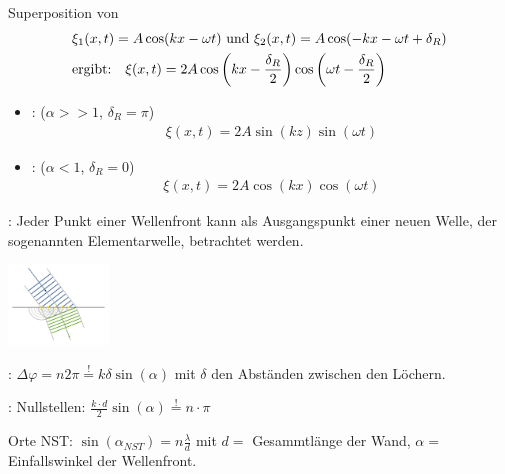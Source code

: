 \vspace{1\baselineskip}

Superposition von
\begin{align*}
    &\xi_1 (x,t) = A \cos(kx-\omega t) \text{ und } \xi_2 (x,t) = A \cos (-kx - \omega t + \delta_R)
    \\ &\text{ergibt:} \quad 
    \xi(x,t) = 2 A \cos \left( k x - \frac{\delta_R}{2} \right) \cos \left( \omega t - \frac{\delta_R}{2} \right)
\end{align*}
\begin{itemize}
    \item {}: ($\alpha >> 1$, $\delta_R = \pi$)
        \begin{align*}
            \xi(x,t) = 2A \sin(kz) \sin(\omega t)
        \end{align*}
    \item {}: ($\alpha < 1$, $\delta_R = 0$)
        \begin{align*}
            \xi(x,t) = 2 A \cos (kx) \cos (\omega t)
        \end{align*}
\end{itemize}

\vspace{1\baselineskip}

:
Jeder Punkt einer Wellenfront kann als Ausgangspunkt einer neuen Welle, der sogenannten
Elementarwelle, betrachtet werden.
\begin{center}
    \includegraphics[width = 0.2\textwidth]{Figures/Huygen.png}
\end{center}

\pagebreak

:
$\Delta \varphi = n 2 \pi \stackrel{!}{=} k \delta \sin(\alpha)$ mit $\delta$ den Abständen
zwischen den Löchern.

\vspace{1\baselineskip}

:
Nullstellen: $\frac{k \cdot d}{2} \sin(\alpha) \stackrel{!}{=} n \cdot \pi$

Orte NST: $\sin(\alpha_{NST}) = n \frac{\lambda}{d}$
mit $d=$ Gesammtlänge der Wand, $\alpha=$ Einfallswinkel der Wellenfront.

